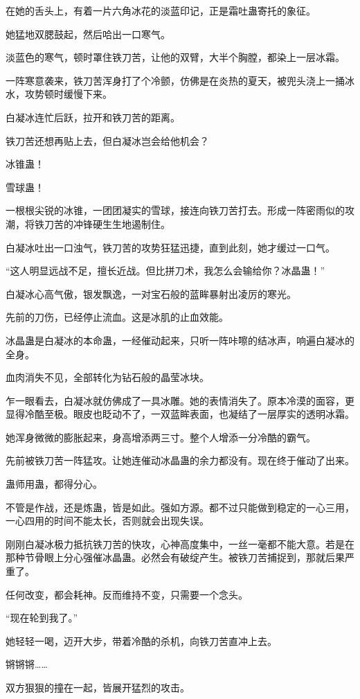\begin{this_body}
在她的舌头上，有着一片六角冰花的淡蓝印记，正是霜吐蛊寄托的象征。

她猛地双腮鼓起，然后哈出一口寒气。

淡蓝色的寒气，顿时罩住铁刀苦，让他的双臂，大半个胸膛，都染上一层冰霜。

一阵寒意袭来，铁刀苦浑身打了个冷颤，仿佛是在炎热的夏天，被兜头浇上一捅冰水，攻势顿时缓慢下来。

白凝冰连忙后跃，拉开和铁刀苦的距离。

铁刀苦还想再贴上去，但白凝冰岂会给他机会？

冰锥蛊！

雪球蛊！

一根根尖锐的冰锥，一团团凝实的雪球，接连向铁刀苦打去。形成一阵密雨似的攻潮，将铁刀苦的冲锋硬生生地遏制住。

白凝冰吐出一口浊气，铁刀苦的攻势狂猛迅捷，直到此刻，她才缓过一口气。

“这人明显远战不足，擅长近战。但比拼刀术，我怎么会输给你？冰晶蛊！”

白凝冰心高气傲，银发飘逸，一对宝石般的蓝眸暴射出凌厉的寒光。

先前的刀伤，已经停止流血。这是冰肌的止血效能。

冰晶蛊是白凝冰的本命蛊，一经催动起来，只听一阵咔嚓的结冰声，响遍白凝冰的全身。

血肉消失不见，全部转化为钻石般的晶莹冰块。

乍一眼看去，白凝冰就仿佛成了一具冰雕。她的表情消失了。原本冷漠的面容，更显得冷酷至极。眼皮也眨动不了，一双蓝眸表面，也凝结了一层厚实的透明冰霜。

她浑身微微的膨胀起来，身高增添两三寸。整个人增添一分冷酷的霸气。

先前被铁刀苦一阵猛攻。让她连催动冰晶蛊的余力都没有。现在终于催动了出来。

蛊师用蛊，都得分心。

不管是作战，还是炼蛊，皆是如此。强如方源。都不过只能做到稳定的一心三用，一心四用的时间不能太长，否则就会出现失误。

刚刚白凝冰极力抵抗铁刀苦的快攻，心神高度集中，一丝一毫都不能大意。若是在那种节骨眼上分心强催冰晶蛊。必然会有破绽产生。被铁刀苦捕捉到，那就后果严重了。

任何改变，都会耗神。反而维持不变，只需要一个念头。

“现在轮到我了。”

她轻轻一喝，迈开大步，带着冷酷的杀机，向铁刀苦直冲上去。

锵锵锵……

双方狠狠的撞在一起，皆展开猛烈的攻击。


\end{this_body}
